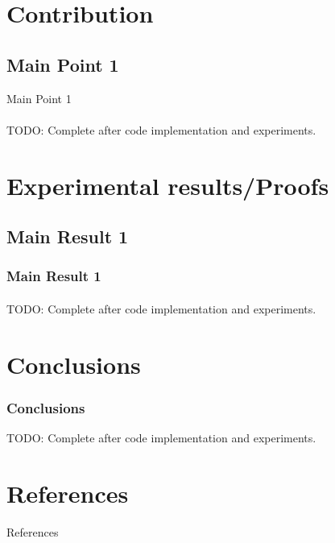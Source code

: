 \documentclass[11pt]{beamer}              %
\begin{document}
\section{Contribution}
\subsection{Main Point 1}
\begin{frame}{Main Point 1}
\framesubtitle{}

TODO: Complete after code implementation and experiments.

\note{
}
\end{frame}

\section{Experimental results/Proofs}

\subsection{Main Result 1}
\begin{frame}
\frametitle{Main Result 1}
\framesubtitle{}
TODO: Complete after code implementation and experiments.
\end{frame}


\section{Conclusions}
\begin{frame}
\frametitle{Conclusions}

TODO: Complete after code implementation and experiments.

\end{frame}

\section*{References}
\begin{frame}{References}
\tiny


\end{frame}

\thankslide
\end{document}
